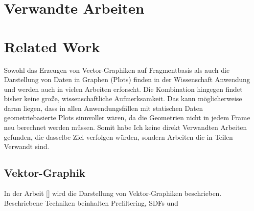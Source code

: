 {\chapter{Verwandte Arbeiten}}
{\chapter{Related Work}}
\label{sec:related}

Sowohl das Erzeugen von Vector-Graphiken auf Fragmentbasis als auch die Darstellung von Daten in Graphen (Plots) finden in der Wissenschaft Anwendung und werden auch in vielen Arbeiten erforscht. Die Kombination hingegen findet bisher keine große, wissenschaftliche Aufmerksamkeit. Das kann möglicherweise daran liegen, dass in allen Anwendungsfällen mit statischen Daten geometriebasierte Plots sinnvoller wären, da die Geometrien nicht in jedem Frame neu berechnet werden müssen. Somit habe Ich keine direkt Verwandten Arbeiten gefunden, die dasselbe Ziel verfolgen würden, sondern Arbeiten die in Teilen Verwandt sind.

\section{Vektor-Graphik}
In der Arbeit [] wird die Darstellung von Vektor-Graphiken beschrieben. Beschriebene Techniken beinhalten Prefiltering, SDFs und

